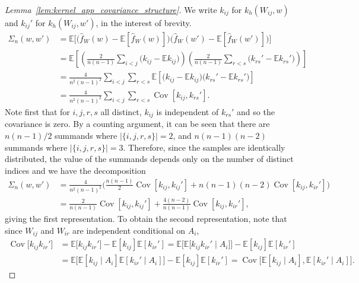 \documentclass[11pt,lof]{puthesis}
\newcommand{\E}{\ensuremath{\mathbb{E}}}
\DeclareMathOperator{\Cov}{Cov}
\theoremstyle{break}
\theoremstyle{proof}
\newtheorem{proof}{Proof}
\begin{document}
\begin{proof}[Lemma~\ref{lem:kernel_app_covariance_structure}]

  We write $k_{i j}$ for $k_h(W_{i j},w)$
  and $k_{i j}'$ for $k_h(W_{i j},w')$, in the interest of brevity.
  \begin{align*}
    \Sigma_n(w,w')
    &=
    \E\Big[
      \big(
        \hat f_W(w)
        - \E[\hat f_W(w)]
      \big)
      \big(
        \hat f_W(w')
        - \E[\hat f_W(w')]
      \big)
    \Big] \\
    &=
    \E\left[
      \left(
        \frac{2}{n(n-1)}
        \sum_{i<j}
        \big(
          k_{i j} - \E k_{i j}
        \big)
      \right)
      \left(
        \frac{2}{n(n-1)}
        \sum_{r<s}
        \big(
          k_{rs}' - \E k_{rs}'
        \big)
      \right)
    \right] \\
    &=
    \frac{4}{n^2(n-1)^2}
    \sum_{i<j}
    \sum_{r<s}
    \E\left[
      \big(
        k_{i j} - \E k_{i j}
      \big)
      \big(
        k_{rs}' - \E k_{rs}'
      \big)
    \right] \\
    &=
    \frac{4}{n^2(n-1)^2}
    \sum_{i<j}
    \sum_{r<s}
    \Cov\left[
      k_{i j},
      k_{rs}'
    \right].
  \end{align*}
  Note first that
  for $i,j,r,s$ all distinct,
  $k_{i j}$ is independent of $k_{rs}'$
  and so the covariance is zero.
  By a counting argument,
  it can be seen that
  there are
  $n(n-1)/2$
  summands where
  $|\{i,j,r,s\}| = 2$,
  and
  $n(n-1)(n-2)$
  summands where
  $|\{i,j,r,s\}| = 3$.
  Therefore, since the samples
  are identically distributed,
  the value of the summands
  depends only on the number of distinct indices
  and we have the decomposition
  \begin{align*}
    \Sigma_n(w,w')
    &=
    \frac{4}{n^2(n-1)^2}
    \bigg(
      \frac{n(n-1)}{2}
      \Cov[k_{i j}, k_{i j}']
      + n(n-1)(n-2)
      \Cov[k_{i j}, k_{i r}']
    \bigg) \\
    &=
    \frac{2}{n(n-1)}
    \Cov[k_{i j}, k_{i j}']
    + \frac{4(n-2)}{n(n-1)}
    \Cov[k_{i j}, k_{i r}'],
  \end{align*}
  giving the first representation.
  To obtain the second representation,
  note that since
  $W_{i j}$ and $W_{i r}$
  are independent conditional
  on $A_i$,
  \begin{align*}
    \Cov\big[
      k_{i j}
      k_{i r}'
    \big]
    &=
    \E\big[
      k_{i j}
      k_{i r}'
    \big]
    -
    \E[k_{i j}]
    \E[k_{i r}']
    =
    \E\big[
      \E\big[
        k_{i j}
        k_{i r}'
        \mid A_i
      \big]
    \big]
    -
    \E[k_{i j}]
    \E[k_{i r}'] \\
    &=
    \E\big[
      \E[k_{i j} \mid A_i]
      \E[k_{i r}' \mid A_i]
    \big]
    -
    \E[k_{i j}]
    \E[k_{i r}']
    =
    \Cov\big[
      \E[k_{i j} \mid A_i],
      \E[k_{i r}' \mid A_i]
    \big].
  \end{align*}
\end{proof}
\end{document}
